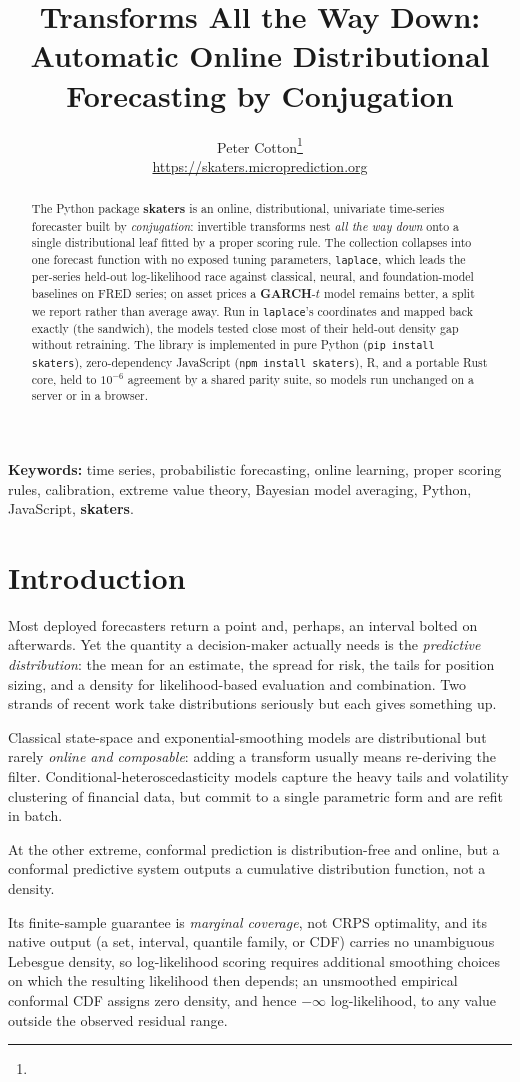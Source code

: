 \documentclass[article]{jss}
\author{
  Peter Cotton\thanks{\email{peter.cotton@microprediction.com}}\\
  \url{https://skaters.microprediction.org}
}
\title{Transforms All the Way Down: Automatic Online Distributional Forecasting by Conjugation}
\providecommand{\proglang}[1]{\textsf{#1}}
\providecommand{\pkg}[1]{\textbf{#1}}
\providecommand{\code}[1]{\texttt{#1}}
\newcommand{\skatersabstract}{
The \proglang{Python} package \pkg{skaters} is an online, distributional,
univariate time-series forecaster built by \emph{conjugation}: invertible
transforms nest \emph{all the way down} onto a single distributional leaf
fitted by a proper scoring rule. The collection collapses into one forecast
function with no exposed tuning parameters, \code{laplace}, which leads the
per-series held-out log-likelihood race against classical, neural, and
foundation-model baselines on \proglang{FRED} series; on asset prices a
\pkg{GARCH}-$t$ model remains better, a split we report rather than average
away. Run in \code{laplace}'s coordinates and mapped back exactly (the
sandwich), the models tested close most of their held-out density gap
without retraining. The library is implemented in pure \proglang{Python}
(\code{pip install skaters}), zero-dependency \proglang{JavaScript}
(\code{npm install skaters}), \proglang{R}, and a portable \proglang{Rust}
core, held to $10^{-6}$ agreement by a shared parity suite, so models run
unchanged on a server or in a browser.
}
\begin{document}
\maketitle

\begin{abstract}
\skatersabstract
\end{abstract}

\noindent\textbf{Keywords:} time series, probabilistic forecasting, online
learning, proper scoring rules, calibration, extreme value theory, Bayesian
model averaging, \proglang{Python}, \proglang{JavaScript}, \pkg{skaters}.

\section{Introduction} \label{sec:intro}

Most deployed forecasters return a point and, perhaps, an interval bolted on
afterwards. Yet the quantity a decision-maker actually needs is the
\emph{predictive distribution}: the mean for an estimate, the spread for risk,
the tails for position sizing, and a density for likelihood-based evaluation and
combination. Two strands of recent work take distributions seriously but each
gives something up.

Classical state-space and exponential-smoothing models
\citep{hyndman2002state,hyndman2008automatic} are distributional but rarely
\emph{online and composable}: adding a transform usually means re-deriving the
filter. Conditional-heteroscedasticity models \citep{engle1982autoregressive,
bollerslev1986generalized} capture the heavy tails and volatility clustering of
financial data, but commit to a single parametric form and are refit in batch.

At the other extreme, conformal prediction
\citep{vovk2005algorithmic,vovk2019conformal} is distribution-free and online,
but a conformal predictive system outputs a cumulative distribution
function, not a density.

Its finite-sample guarantee is \emph{marginal
coverage}, not CRPS optimality, and its native output (a set, interval,
quantile family, or CDF) carries no unambiguous Lebesgue density, so
log-likelihood scoring requires additional smoothing choices on which the
resulting likelihood then depends; an unsmoothed empirical conformal CDF
assigns zero density, and hence $-\infty$ log-likelihood, to any value
outside the observed residual range.
\end{document}
